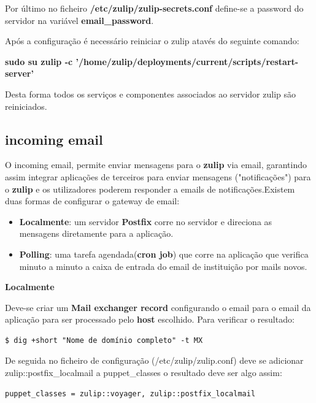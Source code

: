 \documentclass[11pt,a4paper]{report}%
\begin{document}
Por último no ficheiro \textbf{/etc/zulip/zulip-secrets.conf} define-se a password do servidor na variável \newline \textbf{email\_password}.

Após a configuração é necessário reiniciar o zulip atavés do seguinte comando: 

\textbf{sudo su zulip -c '/home/zulip/deployments/current/scripts/restart-server'}

Desta forma todos os serviços e componentes associados ao servidor zulip são reiniciados.


\subsection{incoming email}

O incoming email, permite enviar mensagens  para o \textbf{zulip} via email, garantindo assim integrar aplicações de terceiros para enviar mensagens ("notificações") para o \textbf{zulip} e os utilizadores poderem responder a emails de notificações.\newline Existem duas formas de configurar o gateway de email:
\\

\begin{itemize}
    \item \textbf{Localmente}: um servidor \textbf{Postfix} corre no servidor e direciona as mensagens diretamente para a aplicação.
    \item \textbf{Polling}: uma tarefa agendada(\textbf{cron job}) que corre na aplicação que verifica minuto a minuto a caixa de entrada do email de instituição por mails novos. \newline
\end{itemize} 


\textbf{Localmente}
\newline


Deve-se criar um \textbf{Mail exchanger record} configurando o email para o email da aplicação para ser processado pelo \textbf{host} escolhido.
Para verificar o resultado:
\begin{verbatim}
$ dig +short "Nome de domínio completo" -t MX
\end{verbatim}

De seguida no ficheiro de configuração (/etc/zulip/zulip.conf) deve se adicionar zulip::postfix\_localmail a puppet\_classes o resultado deve ser algo assim:\newline
\begin{verbatim}
puppet_classes = zulip::voyager, zulip::postfix_localmail
\end{verbatim}
\end{document}
